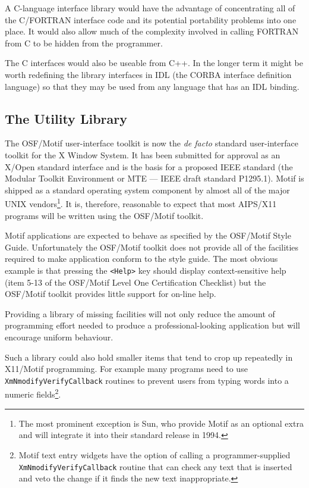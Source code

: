 A C-language interface library would have the advantage of
concentrating all of the C/FORTRAN interface code and its potential
portability problems into one place.  It would also allow much of the
complexity involved in calling FORTRAN from C to be hidden from the
programmer.

The C interfaces would also be useable from C++.  In the longer term
it might be worth redefining the library interfaces in IDL (the CORBA
interface definition language) so that they may be used from any
language that has an IDL binding.

\subsection{The Utility Library}

The OSF/Motif user-interface toolkit is now the {\em de facto}
standard user-interface toolkit for the X Window System.  It has been
submitted for approval as an X/Open standard interface and is the
basis for a proposed IEEE standard (the Modular Toolkit Environment or
MTE --- IEEE draft standard P1295.1).  Motif is shipped as a standard
operating system component by almost all of the major UNIX
vendors\footnote{The most prominent exception is Sun, who provide
Motif as an optional extra and will integrate it into their standard
release in 1994.}.  It is, therefore, reasonable to expect that most
AIPS/X11 programs will be written using the OSF/Motif toolkit.

Motif applications are expected to behave as specified by the
OSF/Motif Style Guide.  Unfortunately the OSF/Motif toolkit does not
provide all of the facilities required to make application conform to
the style guide.  The most obvious example is that pressing the {\tt <Help>}
key should display context-sensitive help (item 5-13 of the OSF/Motif
Level One Certification Checklist) but the OSF/Motif toolkit provides
little support for on-line help.

Providing a library of missing facilities will not only reduce the
amount of programming effort needed to produce a professional-looking
application but will encourage uniform behaviour.

Such a library could also hold smaller items that tend to crop up
repeatedly in X11/Motif programming.  For example many programs need
to use {\tt XmNmodifyVerifyCallback} routines to prevent users from
typing words into a numeric fields\footnote{Motif text entry widgets
have the option of calling a programmer-supplied {\tt
XmNmodifyVerifyCallback} routine that can check any text that is
inserted and veto the change if it finds the new text inappropriate.}.

